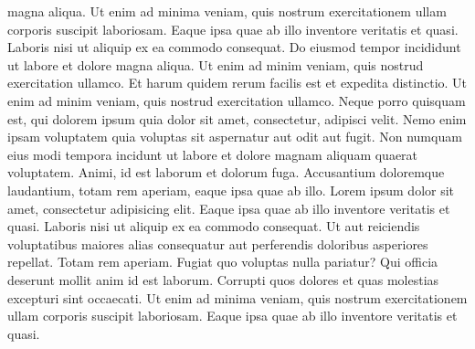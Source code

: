 magna aliqua. Ut enim ad minima veniam, quis nostrum exercitationem
ullam corporis suscipit laboriosam. Eaque ipsa quae ab illo inventore
veritatis et quasi. Laboris nisi ut aliquip ex ea commodo consequat. Do
eiusmod tempor incididunt ut labore et dolore magna aliqua. Ut enim ad
minim veniam, quis nostrud exercitation ullamco. Et harum quidem rerum
facilis est et expedita distinctio. Ut enim ad minim veniam, quis
nostrud exercitation ullamco. Neque porro quisquam est, qui dolorem
ipsum quia dolor sit amet, consectetur, adipisci velit. Nemo enim ipsam
voluptatem quia voluptas sit aspernatur aut odit aut fugit. Non numquam
eius modi tempora incidunt ut labore et dolore magnam aliquam quaerat
voluptatem. Animi, id est laborum et dolorum fuga. Accusantium
doloremque laudantium, totam rem aperiam, eaque ipsa quae ab illo. Lorem
ipsum dolor sit amet, consectetur adipisicing elit. Eaque ipsa quae ab
illo inventore veritatis et quasi. Laboris nisi ut aliquip ex ea commodo
consequat. Ut aut reiciendis voluptatibus maiores alias consequatur aut
perferendis doloribus asperiores repellat. Totam rem aperiam. Fugiat quo
voluptas nulla pariatur? Qui officia deserunt mollit anim id est
laborum. Corrupti quos dolores et quas molestias excepturi sint
occaecati. Ut enim ad minima veniam, quis nostrum exercitationem ullam
corporis suscipit laboriosam. Eaque ipsa quae ab illo inventore
veritatis et quasi.




